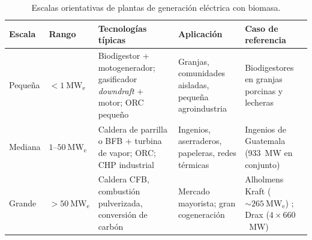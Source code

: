 \begin{table}[htbp]
\centering
\small
\caption{Escalas orientativas de plantas de generación eléctrica con biomasa.}
\label{tab:escalas_planta}
\begin{tabularx}{\textwidth}{@{}p{1.4cm} p{1.7cm} X X p{3.0cm}@{}}
\toprule
\textbf{Escala} & \textbf{Rango} & \textbf{Tecnologías típicas} & \textbf{Aplicación} & \textbf{Caso de referencia} \\
\midrule
Pequeña & $<1~\mathrm{MW_e}$ & Biodigestor + motogenerador; gasificador \textit{downdraft} + motor; ORC pequeño & Granjas, comunidades aisladas, pequeña agroindustria & Biodigestores en granjas porcinas y lecheras \\
Mediana & $1\text{--}50~\mathrm{MW_e}$ & Caldera de parrilla o BFB + turbina de vapor; ORC; CHP industrial & Ingenios, aserraderos, papeleras, redes térmicas & Ingenios de Guatemala (933~MW en conjunto) \cite{eyn2019guatemala} \\
Grande & $>50~\mathrm{MW_e}$ & Caldera CFB, combustión pulverizada, conversión de carbón & Mercado mayorista; gran cogeneración & Alholmens Kraft ($\sim 265~\mathrm{MW_e}$) \cite{alholmenskraft}; Drax ($4 \times 660$~MW) \cite{drax2025annual} \\
\bottomrule
\end{tabularx}
\end{table}

